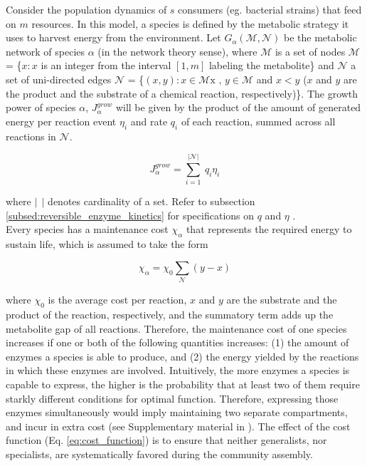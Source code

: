 \documentclass[titlepage,11pt]{article}
\begin{document}
\begin{linenumbers}
\begin{singlespace}
				Consider the population dynamics of $ s $ consumers (eg. bacterial strains) that feed on $ m $ resources. In this model,  a species  is defined by the metabolic strategy it uses to harvest energy from the environment. Let $ G_{\alpha}(\mathcal{M}, \mathcal{N}) $ be the metabolic network of species $ \alpha $ (in the network theory sense), where $ \mathcal{M} $ is a set of nodes $ \mathcal{M}  $ = \{$x:x $ is an integer from the interval $ [1, m]  $ labeling the metabolite\} and $ \mathcal{N} $ a set of uni-directed edges $ \mathcal{N}  $ = \{$ (x, y): x \in \mathcal{M} \textrm{x , } y \in \mathcal{M} $ and $ x < y $ ($ x $ and $ y $ are the product and the substrate of a chemical reaction, respectively)\}. The growth power of species $ \alpha $,  $ J^{grow}_{\alpha}$ will be given by the product of the amount of generated energy per reaction event $ \eta_{i} $ and rate $ q_{i} $ of each reaction, summed across all reactions in $ \mathcal{N} $.
				\begin{linenomath*}	
					\begin{equation}
					J^{grow}_{\alpha} = \sum_{i = 1}^{|\mathcal{N}|} \ q_i \eta_i
					\end{equation}
				\end{linenomath*}
				where $ | \ \ | $ denotes cardinality of a set. Refer to subsection \ref{subsed:reversible_enzyme_kinetics} for specifications on $ q $ and  $ \eta $ .\\
				Every species has a maintenance cost $ \chi_{\alpha} $ that represents the required energy to sustain life, which is assumed to take the form
				\begin{linenomath*}	
					\begin{equation}\label{eq:cost_function}
					\chi_{\alpha} = \chi_0\sum_{\mathcal{N}}(y - x)
					\end{equation}
				\end{linenomath*}
				where $ \chi_0 $ is the average cost per reaction, $ x $ and $ y $ are the substrate and the product of the reaction, respectively, and the summatory term adds up the metabolite gap of all reactions. Therefore, the maintenance cost of one species increases if one or both of the following quantities increases: (1) the amount of enzymes a species is able to produce, and (2) the energy yielded by the reactions in which these enzymes are involved. Intuitively, the more enzymes a species is capable to express, the higher is the probability that at least two of them require starkly different conditions for optimal function. Therefore, expressing those enzymes simultaneously would imply maintaining two separate compartments, and incur in extra cost (see Supplementary material in \citet{Tikhonov2017}). The effect of the cost function (Eq. \ref{eq:cost_function}) is to ensure that neither generalists, nor specialists, are systematically favored during the community assembly.\\

\end{singlespace}
\end{linenumbers}
\end{document}
